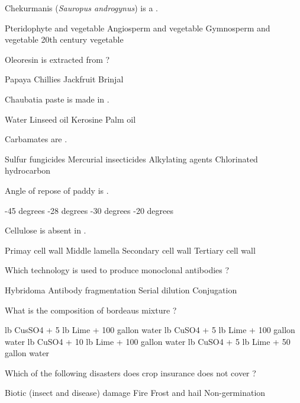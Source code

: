 \begin{questions}
\question Chekurmanis (\textit{Sauropus androgynus}) is a \fillin[][3cm].
\begin{choices}
\choice Pteridophyte and vegetable
\CorrectChoice Angiosperm and vegetable
\choice Gymnosperm and vegetable
\choice 20th century vegetable
\end{choices}

\question Oleoresin is extracted from ?
\begin{choices}
\choice Papaya
\CorrectChoice Chillies
\choice Jackfruit
\choice Brinjal
\end{choices}

\question Chaubatia paste is made in \fillin[][3cm].
\begin{choices}
\choice Water
\CorrectChoice Linseed oil
\choice Kerosine
\choice Palm oil
\end{choices}

\question Carbamates are \fillin[][3cm].
\begin{choices}
\CorrectChoice Sulfur fungicides
\choice Mercurial insecticides
\choice Alkylating agents
\choice Chlorinated hydrocarbon
\end{choices}

\question Angle of repose of paddy is \fillin[][3cm].
\begin{choices}
-45 degrees
-28 degrees
-30 degrees
-20 degrees
\end{choices}

\question Cellulose is absent in \fillin[][3cm].
\begin{choices}
\choice Primay cell wall
\CorrectChoice Middle lamella
\choice Secondary cell wall
\choice Tertiary cell wall
\end{choices}

\question Which technology is used to produce monoclonal antibodies ?
\begin{choices}
\CorrectChoice Hybridoma
\choice Antibody fragmentation
\choice Serial dilution
\choice Conjugation
\end{choices}

\question What is the composition of bordeaus mixture ?
\begin{choices}
 lb CusSO4 + 5 lb Lime + 100 gallon water
 lb CuSO4 + 5 lb Lime + 100 gallon water
 lb CuSO4 + 10 lb Lime + 100 gallon water
 lb CuSO4 + 5 lb Lime + 50 gallon water
\end{choices}

\question Which of the following disasters does crop insurance does not cover ?
\begin{choices}
\choice Biotic (insect and disease) damage
\choice Fire
\choice Frost and hail
\CorrectChoice Non-germination
\end{choices}


\end{questions}
